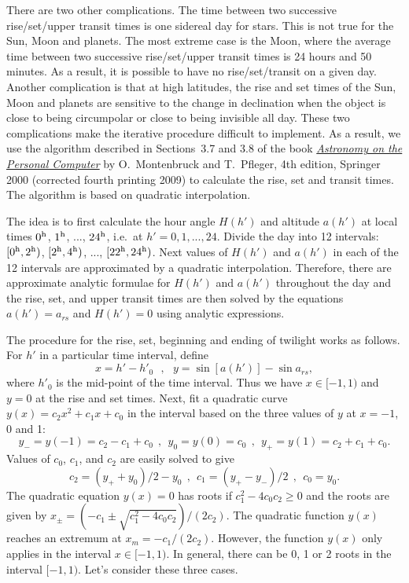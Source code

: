 \documentclass[12pt]{article}
\newcommand \beq {\begin{equation}}
\newcommand \eeq {\end{equation}}
\begin{document}
There are two other complications. The time between two successive 
rise/set/upper transit times is one sidereal day for stars. This is not true 
for the Sun, Moon and planets. The most extreme case is the Moon, where the 
average time between two successive rise/set/upper transit times is 24 hours 
and 50 minutes. As a result, it is possible to have no rise/set/transit on 
a given day. Another complication is that at high latitudes, the rise and set 
times of the Sun, Moon and planets are sensitive to the change in declination 
when the object is close to being circumpolar or close to being invisible all day. 
These two complications make the iterative procedure difficult to implement. As 
a result, we use the algorithm described in Sections~3.7 and 3.8 of the book 
\href{https://www.springer.com/us/book/9783540672210#}{\it Astronomy on the 
Personal Computer} by O.~Montenbruck and T.~Pfleger, 4th edition, Springer 2000 
(corrected fourth printing 2009) to calculate the rise, set and transit times. 
The algorithm is based on quadratic interpolation. 

The idea is to first calculate the hour angle $H(h')$ and altitude $a(h')$ at local times 
$0^{\rm h}$, $1^{\rm h}$, ..., $24^{\rm h}$, i.e.\ at 
$h'=0, 1, ..., 24$. Divide the day into 12 intervals: 
$[0^{\rm h}, 2^{\rm h})$, $[2^{\rm h}, 4^{\rm h})$, ..., $[22^{\rm h}, 24^{\rm h})$. 
Next values of $H(h')$ and $a(h')$ in each of the 12 intervals are approximated by 
a quadratic interpolation. Therefore, there are approximate analytic formulae for $H(h')$ and 
$a(h')$ throughout the day and the rise, set, 
and upper transit times are then solved by the equations $a(h')=a_{rs}$ and $H(h')=0$ 
using analytic expressions. 

The procedure for the rise, set, beginning and ending of twilight works as follows. 
For $h'$ in a particular time interval, define 
\beq
  x = h'-h'_0 \ \ \ , \ \ \ y = \sin [a(h')] - \sin a_{rs} ,
\eeq
where $h'_0$ is the mid-point of the time interval. Thus we have $x\in [-1,1)$ 
and $y=0$ at the rise and set times. 
Next, fit a quadratic curve $y(x)=c_2 x^2+c_1x+c_0$ in the interval 
based on the three values of $y$ at $x=-1$, 0 and 1: 
\beq
  y_- = y(-1)=c_2-c_1+c_0 \ \ , \ \ y_0=y(0)=c_0 \ \ , \ \ y_+=y(1)=c_2+c_1+c_0 .
\eeq
Values of $c_0$, $c_1$, and $c_2$ are easily solved to give 
\beq
  c_2 = (y_+ + y_0)/2 - y_0 \ \ , \ \ c_1 = (y_+ - y_-)/2  \ \ , \ \  c_0=y_0 .
\eeq
The quadratic equation $y(x)=0$ has roots if $c_1^2-4c_0c_2 \geq 0$ and the 
roots are given by $x_{\pm}=(-c_1\pm \sqrt{c_1^2-4c_0c_2})/(2c_2)$.
The quadratic function $y(x)$ 
reaches an extremum at $x_m=-c_1/(2c_2)$. However, the function $y(x)$ only applies 
in the interval $x\in [-1,1)$. In general, there can be 0, 1 or 2 roots in the interval 
$[-1,1)$. Let's consider these three cases. 
\end{document}

